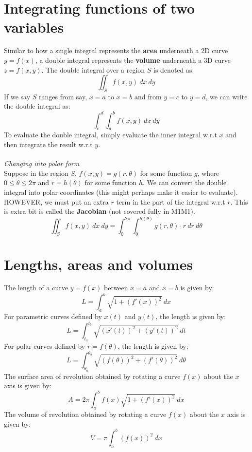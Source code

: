 \documentclass{scrartcl}
\begin{document}
\section{Integrating functions of two variables}
Similar to how a single integral represents the \textbf{area} underneath a 2D curve $ y = f(x) $, a double integral represents the \textbf{volume} underneath a 3D curve $ z = f(x, y) $. The double integral over a region $ S $ is denoted as:
\begin{equation}
\iint_{S} f(x, y) \ dx \ dy
\end{equation}
If we say $ S $ ranges from say, $ x = a $ to $ x = b $ and from $ y = c $ to $ y = d $, we can write the double integral as:
\begin{equation}
\int_{c}^{d} \int_{a}^{b} f(x, y) \ dx \ dy
\end{equation}
To evaluate the double integral, simply evaluate the inner integral w.r.t $ x $ and then integrate the result w.r.t $ y $.
\\\\
\textit{Changing into polar form}
\\
Suppose in the region $ S $, $ f(x, y) = g(r, \theta) $ for some function $ g $, where $ 0 \leq \theta \leq 2 \pi $ and $ r = h(\theta) $ for some function $ h $. We can convert the double integral into polar coordinates (this might perhaps make it easier to evaluate). HOWEVER, we must put an extra $ r $ term in the part of the integral w.r.t $ r $. This is extra bit is called the \textbf{Jacobian} (not covered fully in M1M1).
\begin{equation}
\iint_{S} f(x, y) \ dx \ dy = \int_{0}^{2 \pi} \int_{0}^{h(\theta)} g(r, \theta) \cdot r \ dr \ d \theta
\end{equation}

\section{Lengths, areas and volumes}
The length of a curve $ y = f(x) $ between $ x = a $ and $ x = b $ is given by:
\begin{equation}
L = \int_{a}^{b} \sqrt{1+(f'(x))^{2}} \ dx
\end{equation}
For parametric curves defined by $ x(t) $ and $ y(t) $, the length is given by:
\begin{equation}
L = \int_{t_{a}}^{t_{b}} \sqrt{(x'(t))^{2}+(y'(t))^{2}} \ dt
\end{equation}
For polar curves defined by $ r = f(\theta) $, the length is given by:
\begin{equation}
L = \int_{\theta_{a}}^{\theta_{b}} \sqrt{(f(\theta))^{2}+(f'(\theta))^{2}} \ d \theta
\end{equation}
The surface area of revolution obtained by rotating a curve $ f(x) $ about the $ x $ axis is given by:
\begin{equation}
A = 2 \pi \int_{a}^{b} f(x) \sqrt{1+(f'(x))^{2}} \ dx
\end{equation}
The volume of revolution obtained by rotating a curve $ f(x) $ about the $ x $ axis is given by:
\begin{equation}
V = \pi \int_{a}^{b} (f(x))^{2} \ dx
\end{equation}
\end{document}
